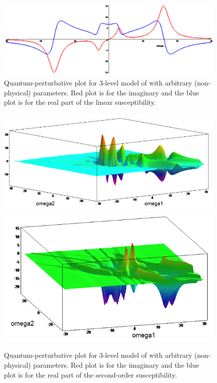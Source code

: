 \documentclass[12pt,twoside,a4paper]{article}
\numberwithin{equation}{subsection}
\numberwithin{figure}{subsection}
\begin{document}
\begin{figure} 
  \includegraphics[width=150mm]{img/qp_plot.png}
  \caption{Quantum-perturbative plot for 3-level model of with arbitrary (non-physical) parameters. Red plot is for the imaginary
  and the blue plot is for the real part of the linear susceptibility.
  \label{fig:qp_plot}}
\end{figure}
\begin{figure} 
  \includegraphics[width=150mm]{img/qp_3da.png} \\
  \includegraphics[width=150mm]{img/qp_3db.png}
  \caption{Quantum-perturbative plot for 3-level model of with arbitrary (non-physical) parameters. Red plot is for the imaginary
  and the blue plot is for the real part of the second-order susceptibility.
  \label{fig:qp_3d}}
\end{figure}
  
\end{document}
